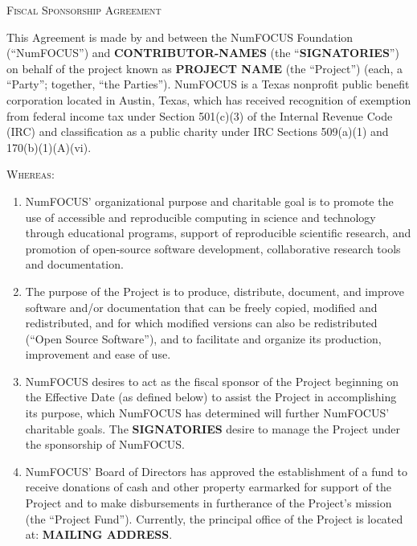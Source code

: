 \documentclass[english,letterpaper,12pt]{article}
\newcommand{\project}{\textbf{PROJECT NAME}}
\newcommand{\contributors}{\textbf{CONTRIBUTOR-NAMES}}
\newcommand{\signatories}{\textbf{SIGNATORIES}}
\newcommand{\leadershipaddress}{\textbf{MAILING ADDRESS}}
\begin{document}
\begin{center}
\textsc{\Huge Fiscal Sponsorship Agreement}{\Huge {} } 
\par\end{center}

\bigskip{}

This Agreement is made by and between the NumFOCUS Foundation (``NumFOCUS'')
and \contributors{} (the ``\signatories{}'') on behalf of the project known as
\project{} (the ``Project'') (each, a ``Party''; together, ``the Parties'').
NumFOCUS is a Texas nonprofit public benefit corporation located in Austin,
Texas, which has received recognition of exemption from federal income tax under
Section 501(c)(3) of the Internal Revenue Code (IRC) and classification as a
public charity under IRC Sections 509(a)(1) and 170(b)(1)(A)(vi).

\textsc{Whereas:}

\begin{enumerate}[label=\Alph*.,ref=\S \Alph*]

\item NumFOCUS’ organizational purpose and charitable goal is to promote the
  use of accessible and reproducible computing in science and technology
  through educational programs, support of reproducible scientific research,
  and promotion of open-source software development, collaborative research
  tools and documentation.

\item The purpose of the Project is to produce, distribute, document, and
  improve software and/or documentation that can be freely copied, modified and
  redistributed, and for which modified versions can also be redistributed
  (``Open Source Software''), and to facilitate and organize its production,
  improvement and ease of use.

\item NumFOCUS desires to act as the fiscal sponsor of the Project beginning on
  the Effective Date (as defined below) to assist the Project in accomplishing
  its purpose, which NumFOCUS has determined will further NumFOCUS' charitable
  goals. The \signatories{} desire to manage the Project under the sponsorship
  of NumFOCUS.

\item NumFOCUS' Board of Directors has approved the establishment of a fund to
  receive donations of cash and other property earmarked for support of the
  Project and to make disbursements in furtherance of the Project's mission
  (the ``Project Fund''). Currently, the principal office of the Project is
  located at: \leadershipaddress{}.

\end{enumerate}
\end{document}
